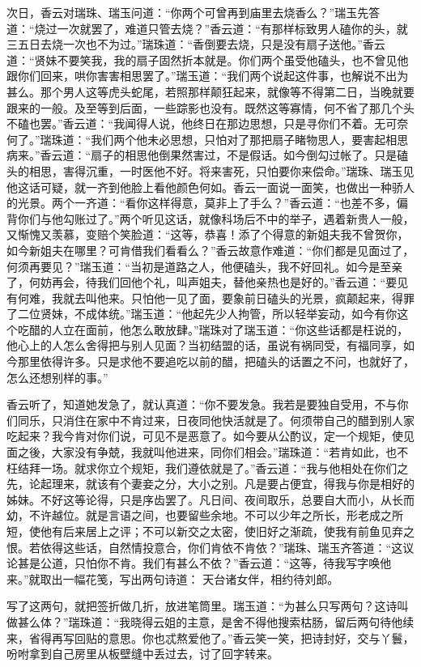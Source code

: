 \documentclass[a4paper,12pt,UTF8,twoside]{ctexbook}
\begin{document}
次日，香云对瑞珠、瑞玉问道：“你两个可曾再到庙里去烧香么？”瑞玉先答道：“烧过一次就罢了，难道只管去烧？”香云道：“有那样标致男人磕你的头，就三五日去烧一次也不为过。”瑞珠道：“香倒要去烧，只是没有扇子送他。”香云道：“贤妹不要笑我，我的扇子固然折本就是。你们两个虽受他磕头，也不曾见他跟你们回来，哄你害害相思罢了。”瑞玉道：“我们两个说起这件事，也解说不出为甚么。那个男人这等虎头蛇尾，若照那样颠狂起来，就像等不得第二日，当晚就要跟来的一般。及至等到后面，一些踪影也没有。既然这等寡情，何不省了那几个头不磕也罢。”香云道：“我闻得人说，他终日在那边思想，只是寻你们不着。无可奈何了。”瑞珠道：“我们两个他未必思想，只怕对了那把扇子睹物思人，要害起相思病来。”香云道：“扇子的相思他倒果然害过，不是假话。如今倒勾过帐了。只是磕头的相思，害得沉重，一时医他不好。将来害死，只怕要你来偿命。”瑞珠、瑞玉见他这话可疑，就一齐到他脸上看他颜色何如。香云一面说一面笑，也做出一种骄人的光景。两个一齐道：“看你这样得意，莫非上了手么？”香云道：“也差不多，偏背你们与他勾账过了。”两个听见这话，就像科场后不中的举子，遇着新贵人一般，又惭愧又羡慕，变赔个笑脸道：“这等，恭喜！添了个得意的新姐夫我不曾贺你，如今新姐夫在哪里？可肯借我们看看么？”香云故意作难道：“你们都是见面过了，何须再要见？”瑞玉道：“当初是道路之人，他便磕头，我不好回礼。如今是至亲了，何妨再会，待我们回他个礼，叫声姐夫，替他亲热也是好的。”香云道：“要见有何难，我就去叫他来。只怕他一见了面，要象前日磕头的光景，疯颠起来，得罪了二位贤妹，不成体统。”瑞玉道：“他起先少人拘管，所以轻举妄动，如今有你这个吃醋的人立在面前，他怎么敢放肆。”瑞珠对了瑞玉道：“你这些话都是枉说的，他心上的人怎么舍得把与别人见面？当初结盟的话，虽说有祸同受，有福同享，如今那里依得许多。只是求他不要追吃以前的醋，把磕头的话置之不问，也就好了，怎么还想别样的事。”

香云听了，知道她发急了，就认真道：“你不要发急。我若是要独自受用，不与你们同乐，只消住在家中不肯过来，日夜同他快活就是了。何须带自己的醋到别人家吃起来？我今肯对你们说，可见不是恶意了。如今要从公酌议，定一个规矩，使见面之後，大家没有争兢，我就叫他进来，同你们相会。”瑞珠道：“若肯如此，也不枉结拜一场。就求你立个规矩，我们遵依就是了。”香云道：“我与他相处在你们之先，论起理来，就该有个妻妾之分，大小之别。凡是要占便宜，得我与你是相好的姊妹。不好这等论得，只是序齿罢了。凡日间、夜间取乐，总要自大而小，从长而幼，不许越位。就是言语之间，也要留些余地。不可以少年之所长，形老成之所短，使他有后来居上之评；不可以新交之太密，使旧好之渐疏，使我有前鱼见弃之恨。若依得这些话，自然情投意合，你们肯依不肯依？”瑞珠、瑞玉齐答道：“这议论甚是公道，只怕你不肯。我们有甚么不依？”香云道：“这等，待我写字唤他来。”就取出一幅花笺，写出两句诗道：
天台诸女伴，相约待刘郎。

写了这两句，就把签折做几折，放进笔筒里。瑞玉道：“为甚么只写两句？这诗叫做甚么体？”瑞珠道：“我晓得云姐的主意，是舍不得他搜索枯肠，留后两句待他续来，省得再写回贴的意思。你也忒熬爱他了。”香云笑一笑，把诗封好，交与丫鬟，吩咐拿到自己房里从板壁缝中丢过去，讨了回字转来。
\end{document}
